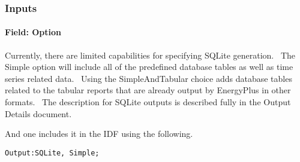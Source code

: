 \subsubsection{Inputs}\label{inputs-12-014}

\paragraph{Field: Option}\label{field-option}

Currently, there are limited capabilities for specifying SQLite generation.~ The Simple option will include all of the predefined database tables as well as time series related data.~ Using the SimpleAndTabular choice adds database tables related to the tabular reports that are already output by EnergyPlus in other formats.~ The description for SQLite outputs is described fully in the Output Details document.

And one includes it in the IDF using the following.

\begin{lstlisting}
Output:SQLite, Simple;
\end{lstlisting}
